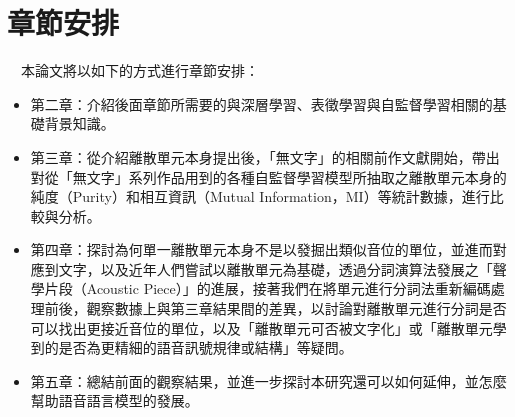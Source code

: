 \section{章節安排}

　本論文將以如下的方式進行章節安排：

\begin{itemize} \itemsep -2pt
  \item 第二章：介紹後面章節所需要的與深層學習、表徵學習與自監督學習相關的基礎背景知識。
  \item 第三章：從介紹離散單元本身提出後，「無文字」的相關前作文獻開始，帶出對從「無文字」系列作品用到的各種自監督學習模型所抽取之離散單元本身的純度（Purity）和相互資訊（Mutual Information，MI）等統計數據，進行比較與分析。
  \item 第四章：探討為何單一離散單元本身不是以發掘出類似音位的單位，並進而對應到文字，以及近年人們嘗試以離散單元為基礎，透過分詞演算法發展之「聲學片段（Acoustic Piece）\cite{ren_speech_2022}」的進展，接著我們在將單元進行分詞法重新編碼處理前後，觀察數據上與第三章結果間的差異，以討論對離散單元進行分詞是否可以找出更接近音位的單位，以及「離散單元可否被文字化」或「離散單元學到的是否為更精細的語音訊號規律或結構」等疑問。
  \item 第五章：總結前面的觀察結果，並進一步探討本研究還可以如何延伸，並怎麼幫助語音語言模型的發展。
\end{itemize}
